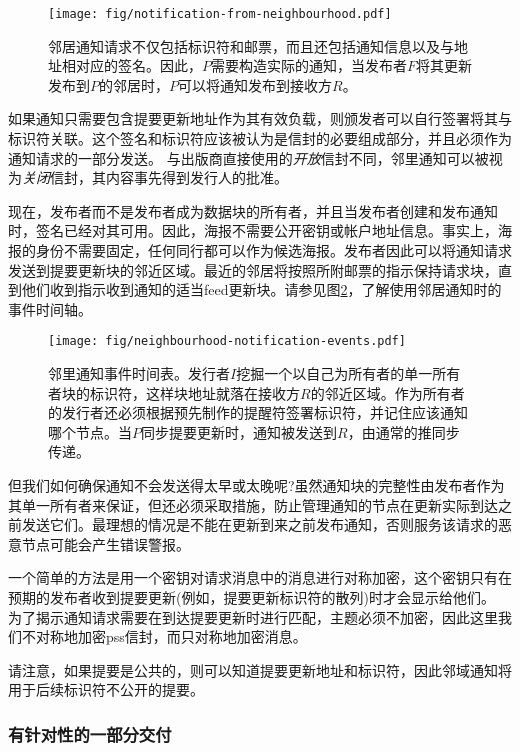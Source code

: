 \begin{figure}[htbp]
\centering
\texttt{[image: fig/notification-from-neighbourhood.pdf]}
\caption[社区通知\statusgreen]{邻居通知请求不仅包括标识符和邮票，而且还包括通知信息以及与地址相对应的签名。因此，$P$需要构造实际的通知，当发布者$F$将其更新发布到$P$的邻居时，$P$可以将通知发布到接收方$R$。}
\label{fig:notification-from-neighbourhood}
\end{figure}

如果通知只需要包含提要更新地址作为其有效负载，则颁发者可以自行签署将其与标识符关联。这个签名和标识符应该被认为是信封的必要组成部分，并且必须作为通知请求的一部分发送。
与出版商直接使用的\emph{开放}信封不同，邻里通知可以被视为\emph{关闭}信封，其内容事先得到发行人的批准。

现在，发布者而不是发布者成为数据块的所有者，并且当发布者创建和发布通知时，签名已经对其可用。因此，海报不需要公开密钥或帐户地址信息。事实上，海报的身份不需要固定，任何同行都可以作为候选海报。发布者因此可以将通知请求发送到提要更新块的邻近区域。最近的邻居将按照所附邮票的指示保持请求块，直到他们收到指示收到通知的适当feed更新块。请参见图\ref{fig:neighbourhood-notification-events}，了解使用邻居通知时的事件时间轴。

\begin{figure}[htbp]
\centering
\texttt{[image: fig/neighbourhood-notification-events.pdf]}
\caption[事件的邻里通知时间表\statusgreen]{邻里通知事件时间表。发行者$I$挖掘一个以自己为所有者的单一所有者块的标识符，这样块地址就落在接收方$R$的邻近区域。作为所有者的发行者还必须根据预先制作的提醒符签署标识符，并记住应该通知哪个节点。当$P$同步提要更新时，通知被发送到$R$，由通常的推同步传递。}
\label{fig:neighbourhood-notification-events}
\end{figure}
  

但我们如何确保通知不会发送得太早或太晚呢?虽然通知块的完整性由发布者作为其单一所有者来保证，但还必须采取措施，防止管理通知的节点在更新实际到达之前发送它们。最理想的情况是不能在更新到来之前发布通知，否则服务该请求的恶意节点可能会产生错误警报。

一个简单的方法是用一个密钥对请求消息中的消息进行对称加密，这个密钥只有在预期的发布者收到提要更新(例如，提要更新标识符的散列)时才会显示给他们。
为了揭示通知请求需要在到达提要更新时进行匹配，主题必须不加密，因此这里我们不对称地加密pss信封，而只对称地加密消息。

请注意，如果提要是公共的，则可以知道提要更新地址和标识符，因此邻域通知将用于后续标识符不公开的提要。

\subsubsection{有针对性的一部分交付}

